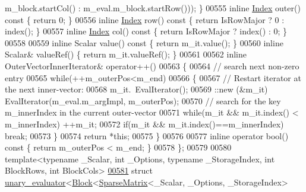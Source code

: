 \begin{DoxyCode}
      m\_block.startCol() : m\_eval.m\_block.startRow())); \}
00555   \textcolor{keyword}{inline} \hyperlink{namespace_eigen_a62e77e0933482dafde8fe197d9a2cfde}{Index} outer()\textcolor{keyword}{  const }\{ \textcolor{keywordflow}{return} 0; \}
00556   \textcolor{keyword}{inline} \hyperlink{namespace_eigen_a62e77e0933482dafde8fe197d9a2cfde}{Index} row()\textcolor{keyword}{    const }\{ \textcolor{keywordflow}{return} IsRowMajor ? 0 : index(); \}
00557   \textcolor{keyword}{inline} \hyperlink{namespace_eigen_a62e77e0933482dafde8fe197d9a2cfde}{Index} col()\textcolor{keyword}{    const }\{ \textcolor{keywordflow}{return} IsRowMajor ? index() : 0; \}
00558 
00559   \textcolor{keyword}{inline} Scalar value()\textcolor{keyword}{ const }\{ \textcolor{keywordflow}{return} m\_it.value(); \}
00560   \textcolor{keyword}{inline} Scalar& valueRef() \{ \textcolor{keywordflow}{return} m\_it.valueRef(); \}
00561 
00562   \textcolor{keyword}{inline} OuterVectorInnerIterator& operator++()
00563   \{
00564     \textcolor{comment}{// search next non-zero entry}
00565     \textcolor{keywordflow}{while}(++m\_outerPos<m\_end)
00566     \{
00567       \textcolor{comment}{// Restart iterator at the next inner-vector:}
00568       m\_it.~EvalIterator();
00569       ::new (&m\_it) EvalIterator(m\_eval.m\_argImpl, m\_outerPos);
00570       \textcolor{comment}{// search for the key m\_innerIndex in the current outer-vector}
00571       \textcolor{keywordflow}{while}(m\_it && m\_it.index() < m\_innerIndex) ++m\_it;
00572       \textcolor{keywordflow}{if}(m\_it && m\_it.index()==m\_innerIndex) \textcolor{keywordflow}{break};
00573     \}
00574     \textcolor{keywordflow}{return} *\textcolor{keyword}{this};
00575   \}
00576 
00577   \textcolor{keyword}{inline} \textcolor{keyword}{operator} bool()\textcolor{keyword}{ const }\{ \textcolor{keywordflow}{return} m\_outerPos < m\_end; \}
00578 \};
00579 
00580 \textcolor{keyword}{template}<\textcolor{keyword}{typename} \_Scalar, \textcolor{keywordtype}{int} \_Options, \textcolor{keyword}{typename} \_StorageIndex, \textcolor{keywordtype}{int} BlockRows, \textcolor{keywordtype}{int} BlockCols>
\hyperlink{struct_eigen_1_1internal_1_1unary__evaluator_3_01_block_3_01_sparse_matrix_3_01___scalar_00_01__bc162881393553b921ff4fd46550ce3d}{00581} \textcolor{keyword}{struct }\hyperlink{struct_eigen_1_1internal_1_1unary__evaluator}{unary\_evaluator}<\hyperlink{group___core___module_class_eigen_1_1_block}{Block}<\hyperlink{group___sparse_core___module_class_eigen_1_1_sparse_matrix}{SparseMatrix}<\_Scalar, \_Options, \_StorageIndex>

\end{DoxyCode}
